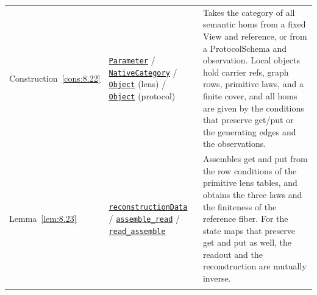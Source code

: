 \begin{xltabular}{\linewidth}{@{}LLL@{}}
\addlinespace[3pt]
Construction~\ref{cons:8.22} & \href{https://github.com/iroha1203/AlgebraicArchitectureTheoryV2/blob/719f81f47d410701fd82c2bc88613cc140c59377/research/lean/ResearchLean/AG/LocalSemanticReconstruction/IndependentAATPrimitiveReconstruction.lean\#L55}{\texttt{Parameter}} / \href{https://github.com/iroha1203/AlgebraicArchitectureTheoryV2/blob/719f81f47d410701fd82c2bc88613cc140c59377/research/lean/ResearchLean/AG/LocalSemanticReconstruction/IndependentAATPrimitiveReconstruction.lean\#L61}{\texttt{Native\allowbreak{}Category}} / \href{https://github.com/iroha1203/AlgebraicArchitectureTheoryV2/blob/719f81f47d410701fd82c2bc88613cc140c59377/research/lean/ResearchLean/AG/LocalSemanticReconstruction/IndependentLensPrimitiveReconstruction.lean\#L301}{\texttt{Object}} (lens) / \href{https://github.com/iroha1203/AlgebraicArchitectureTheoryV2/blob/719f81f47d410701fd82c2bc88613cc140c59377/research/lean/ResearchLean/AG/LocalSemanticReconstruction/IndependentProtocolPrimitiveReconstruction.lean\#L449}{\texttt{Object}} (protocol) & Takes the category of all semantic homs from a fixed View and reference, or from a ProtocolSchema and observation. Local objects hold carrier refs, graph rows, primitive laws, and a finite cover, and all homs are given by the conditions that preserve get/put or the generating edges and the observations. \\
\addlinespace[3pt]
Lemma~\ref{lem:8.23} & \href{https://github.com/iroha1203/AlgebraicArchitectureTheoryV2/blob/719f81f47d410701fd82c2bc88613cc140c59377/research/lean/ResearchLean/AG/LocalSemanticReconstruction/IndependentLensPrimitiveReconstruction.lean\#L1370}{\texttt{reconstruction\allowbreak{}Data}} / \href{https://github.com/iroha1203/AlgebraicArchitectureTheoryV2/blob/719f81f47d410701fd82c2bc88613cc140c59377/research/lean/ResearchLean/AG/LocalSemanticReconstruction/IndependentLensPrimitiveReconstruction.lean\#L1378}{\texttt{assemble\_\allowbreak{}read}} / \href{https://github.com/iroha1203/AlgebraicArchitectureTheoryV2/blob/719f81f47d410701fd82c2bc88613cc140c59377/research/lean/ResearchLean/AG/LocalSemanticReconstruction/IndependentLensPrimitiveReconstruction.lean\#L1387}{\texttt{read\_\allowbreak{}assemble}} & Assembles get and put from the row conditions of the primitive lens tables, and obtains the three laws and the finiteness of the reference fiber. For the state maps that preserve get and put as well, the readout and the reconstruction are mutually inverse. \\
\addlinespace[3pt]

\end{xltabular}
